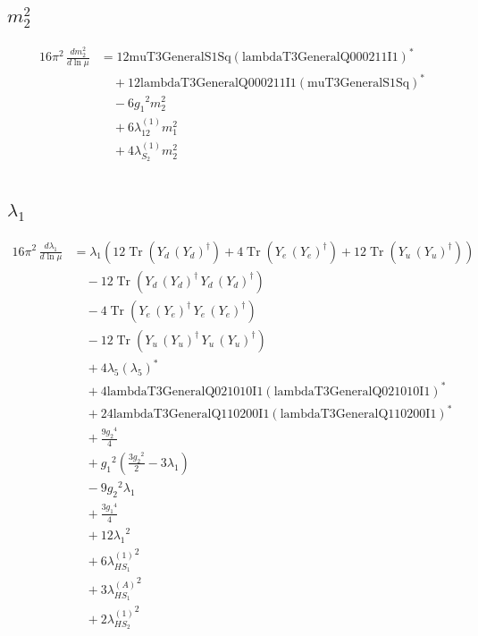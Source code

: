 \documentclass[10pt,a4paper]{article}
\begin{document}
\subsection*{$m_2^2$}
\begin{align*}
16\pi^2\,\frac{d m_2^2}{d\ln\mu} &=12 \text{muT3GeneralS1Sq} \left(\text{lambdaT3GeneralQ000211I1}\right)^{*} \\
&\quad +12 \text{lambdaT3GeneralQ000211I1} \left(\text{muT3GeneralS1Sq}\right)^{*} \\
&\quad -6 {g_1}^2 {m_2^2} \\
&\quad +6 {\lambda_{12}^{(1)}} {m_1^2} \\
&\quad +4 {\lambda_{S_2}^{(1)}} {m_2^2} \\
\end{align*}
\subsection*{$\lambda_1$}
\begin{align*}
16\pi^2\,\frac{d \lambda_1}{d\ln\mu} &={\lambda_1} (12 \operatorname{Tr}\!\left({Y_d}\,\left({Y_d}\right)^{\dagger}\right)+4 \operatorname{Tr}\!\left({Y_e}\,\left({Y_e}\right)^{\dagger}\right)+12 \operatorname{Tr}\!\left({Y_u}\,\left({Y_u}\right)^{\dagger}\right)) \\
&\quad -12 \operatorname{Tr}\!\left({Y_d}\,\left({Y_d}\right)^{\dagger}\,{Y_d}\,\left({Y_d}\right)^{\dagger}\right) \\
&\quad -4 \operatorname{Tr}\!\left({Y_e}\,\left({Y_e}\right)^{\dagger}\,{Y_e}\,\left({Y_e}\right)^{\dagger}\right) \\
&\quad -12 \operatorname{Tr}\!\left({Y_u}\,\left({Y_u}\right)^{\dagger}\,{Y_u}\,\left({Y_u}\right)^{\dagger}\right) \\
&\quad +4 {\lambda_5} \left({\lambda_5}\right)^{*} \\
&\quad +4 \text{lambdaT3GeneralQ021010I1} \left(\text{lambdaT3GeneralQ021010I1}\right)^{*} \\
&\quad +24 \text{lambdaT3GeneralQ110200I1} \left(\text{lambdaT3GeneralQ110200I1}\right)^{*} \\
&\quad +\frac{9 {g_2}^4}{4} \\
&\quad +{g_1}^2 \left(\frac{3 {g_2}^2}{2}-3 {\lambda_1}\right) \\
&\quad -9 {g_2}^2 {\lambda_1} \\
&\quad +\frac{3 {g_1}^4}{4} \\
&\quad +12 {\lambda_1}^2 \\
&\quad +6 {\lambda_{HS_1}^{(1)}}^2 \\
&\quad +3 {\lambda_{HS_1}^{(A)}}^2 \\
&\quad +2 {\lambda_{HS_2}^{(1)}}^2 \\
\end{align*}
\end{document}
